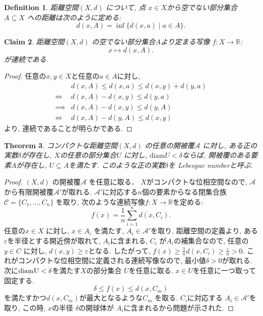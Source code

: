 \documentclass[lualatex]{ltjsbook}
\newtheorem{theorem}{Theorem}[chapter]
\newtheorem{definition}[theorem]{Definition}
\newtheorem{claim}[theorem]{Claim}
\theoremstyle{remark}
\theoremstyle{plain}
\begin{document}
\begin{definition}
	距離空間$\left( X , d \right) $ について,  点 $x \in  X$から空でない部分集合 $  A \subseteq X$ への距離は次のように定める:
	\[
	d\left( x, A \right) = \inf  \{d\left( x, a \right)  \mid a \in A\} 
	.\] 
\end{definition}

\begin{claim}
	距離空間$\left( X , d \right) $ の空でない部分集合$A$より定まる写像 $f: X \to \mathbb{R}$:
	\[
	x \mapsto d(x, A)
	.\] 
が連続である.
\end{claim}

\begin{proof}
	任意の$x, y \in X$と任意の$a \in A$に対し,  
	\[
	\begin{aligned}
		& d\left( x, A \right)   \le d(x, a) \le d(x, y) + d(y, a)\\
		\iff &d(x, A) - d(x, y)  \le d(y, a) \\
		\implies &d(x, A) -d(x, y) \le d(y, A)\\
		\iff & d(x, A) -d(y, A) \le d(x, y)
	\end{aligned}
	\] 
	より,  連続であることが明らかである.
\end{proof}


\begin{theorem}
	コンパクトな距離空間$\left( X, d \right) $ の任意の開被覆$\mathcal{A}$ に対し,  
	ある正の実数$\delta$が存在し,  $X$の任意の部分集合$U$ に対し,  $\mathrm{diam}U < \delta$ならば,  開被覆のある要素$A$が存在し,  $U \subseteq A$を満たす.
	このような正の実数$\delta$を Lebesgue numberと呼ぶ.
\end{theorem}

\begin{proof}
	$\left( X, d \right) $ の開被覆$\mathcal{A}$ を任意に取る．
	$X$がコンパクトな位相空間なので,   $\mathcal{A}$ から有限開被覆$\mathcal{A}'$が取れる. $\mathcal{A}'$に対応する$n$個の要素からなる閉集合族$\mathcal{C} = \{C_1,  \ldots ,  C_{n}\} $ を取り,  次のような連続写像$f: X \to \mathbb{R}$を定める:
	\[
		f(x) = \frac{1}{n}\sum_{i =1}^n d(x, C_i)
	.\]
	任意の$x \in X $ に対し,  
	$x \in A_i$ を満たす,  $A_i \in \mathcal{A}'$を取り,  
	距離空間の定義より,  ある$\varepsilon$を半径とする開近傍が取れて, 
	$A_i$に含まれる, 
	$C_i$ が$A_i$の補集合なので,  
	任意の $y \in C$ に対し,   $d(x, y) \ge \varepsilon$となる. 
	したがって,  
	$f(x) \ge \frac{1}{n}d(x, C_i) \ge \frac{\varepsilon}{n}>0$.
	これがコンパクトな位相空間に定義される連続写像なので,   最小値$\delta >0$が取れる.
	次に$\rm{diam}U<\delta$を満たす$X$の部分集合 $U$を任意に取る.  $x \in U$を任意に一つ取って固定する.
	 $$\delta \le f(x) \le d(x, C_m)$$
	  を満たすかつ$d(x, C_m)$が最大となるような$C_m$ を取る.
	  $C_i$に対応する $A_i \in \mathcal{A}'$を取り,  この時,  $x$の半径 $\delta$の開球体が $A_i$に含まれるから問題が示された.
\end{proof}
\end{document}
